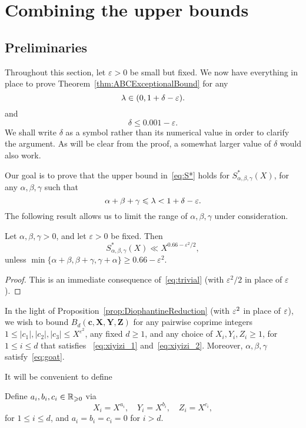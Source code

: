 \chapter{Combining the upper bounds}

\section{Preliminaries}

Throughout this section, let $\varepsilon>0$ be small but fixed.
We now have everything in place to prove Theorem~\ref{thm:ABCExceptionalBound} for any
\[
\lambda\in (0,1+\delta-\varepsilon).
\]
and
\[\delta\le 0.001-\varepsilon.\]
We shall write $\delta$ as a symbol rather than its numerical value in order to clarify the argument.
As will be clear from the proof, a somewhat larger value of $\delta$ would also work.

Our goal is to prove that the upper bound in~\eqref{eq:S*} holds for $S^{*}_{\alpha,\beta,\gamma}(X)$,
for any $\alpha,\beta,\gamma$ such that
\begin{equation}\label{eq:goat}
\alpha+\beta+\gamma\leqslant \lambda < 1+\delta -\varepsilon.
\end{equation}
The following result allows us to limit the range of $\alpha,\beta,\gamma$ under consideration.

\begin{proposition}\label{prop:TrivialBoundforSstar}
  Let $\alpha,\beta,\gamma>0$, and let $\varepsilon>0$ be fixed. Then
  \[
  S^*_{\alpha,\beta,\gamma}(X)\ll X^{0.66-\varepsilon^2/2},
  \]
  unless $\min\{\alpha+\beta, \beta+\gamma,\gamma+\alpha\}\geq 0.66-\varepsilon^2$.
\end{proposition}
\begin{proof}
  This is an immediate consequence of~\eqref{eq:trivial} (with $\varepsilon^2/2$ in place of $\varepsilon$).
\end{proof}


In the light of Proposition~\ref{prop:DiophantineReduction} (with $\varepsilon^2$ in place of $\varepsilon$), we wish to bound $B_d(\mathbf{c},\mathbf{X},\mathbf{Y},\mathbf{Z})$ for any
 pairwise coprime integers $1\leq |c_1|,|c_2|,|c_3|\leq X^{\varepsilon^2}$, any fixed $d\geq 1$,
 and any choice of
 $X_i,Y_i,Z_i\geq 1$, for $1\leq i\leq d$ that satisfies
~\eqref{eq:xiyizi_1} and~\eqref{eq:xiyizi_2}.
 Moreover,
 $
 \alpha,\beta,\gamma
 $ satisfy~\eqref{eq:goat}.

It will be convenient to define
\begin{definition}\label{def:aibici}
  Define $a_i,b_i,c_i\in \mathbb{R}_{\geqslant0}$ via
  \[
  X_i=X^{a_i}, \quad Y_i=X^{b_i}, \quad Z_i=X^{c_i},
  \]
  for $1\leq i\leq d$, and $a_i=b_i=c_i=0$ for $i>d$.
\end{definition}

